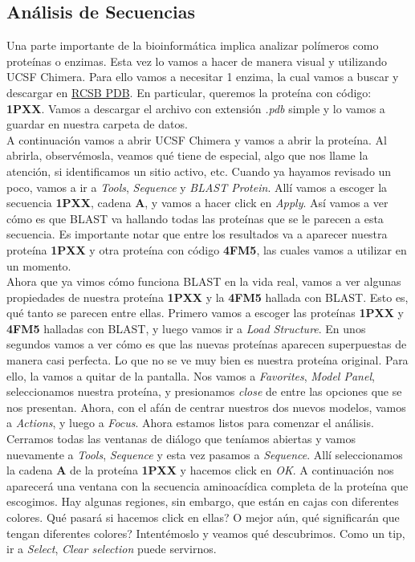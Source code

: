 \documentclass[10pt,letterpaper]{article}
\begin{document}
\subsection{An\'alisis de Secuencias}
Una parte importante de la bioinform\'atica implica analizar pol\'imeros como prote\'inas o enzimas. Esta vez lo vamos a hacer de manera visual y utilizando UCSF Chimera. Para ello vamos a necesitar 1 enzima, la cual vamos a buscar y descargar en \href{http://www.rcsb.org/pdb/home/home.do}{RCSB PDB}. En particular, queremos la prote\'ina con c\'odigo: \textbf{1PXX}. Vamos a descargar el archivo con extensi\'on \emph{.pdb} simple y lo vamos a guardar en nuestra carpeta de datos.\\

A continuaci\'on vamos a abrir UCSF Chimera y vamos a abrir la prote\'ina. Al abrirla, observ\'emosla, veamos qu\'e tiene de especial, algo que nos llame la atenci\'on, si identificamos un sitio activo, etc. Cuando ya hayamos revisado un poco, vamos a ir a \emph{Tools}, \emph{Sequence} y \emph{BLAST Protein}. All\'i vamos a escoger la secuencia \textbf{1PXX}, cadena \textbf{A}, y vamos a hacer click en \emph{Apply}. As\'i vamos a ver c\'omo es que BLAST va hallando todas las prote\'inas que se le parecen a esta secuencia. Es importante notar que entre los resultados va a aparecer nuestra prote\'ina \textbf{1PXX} y otra prote\'ina con c\'odigo \textbf{4FM5}, las cuales vamos a utilizar en un momento.\\

Ahora que ya vimos c\'omo funciona BLAST en la vida real, vamos a ver algunas propiedades de nuestra prote\'ina \textbf{1PXX} y la \textbf{4FM5} hallada con BLAST. Esto es, qu\'e tanto se parecen entre ellas. Primero vamos a escoger las prote\'inas \textbf{1PXX} y \textbf{4FM5} halladas con BLAST, y luego vamos ir a \emph{Load Structure}. En unos segundos vamos a ver c\'omo es que las nuevas prote\'inas aparecen superpuestas de manera casi perfecta. Lo que no se ve muy bien es nuestra prote\'ina original. Para ello, la vamos a quitar de la pantalla. Nos vamos a \emph{Favorites}, \emph{Model Panel}, seleccionamos nuestra prote\'ina, y presionamos \emph{close} de entre las opciones que se nos presentan. Ahora, con el af\'an de centrar nuestros dos nuevos modelos, vamos a \emph{Actions}, y luego a \emph{Focus}. Ahora estamos listos para comenzar el an\'alisis.\\

Cerramos todas las ventanas de di\'alogo que ten\'iamos abiertas y vamos nuevamente a \emph{Tools}, \emph{Sequence} y esta vez pasamos a \emph{Sequence}. All\'i seleccionamos la cadena \textbf{A} de la prote\'ina \textbf{1PXX} y hacemos click en \emph{OK}. A continuaci\'on nos aparecer\'a una ventana con la secuencia aminoac\'idica completa de la prote\'ina que escogimos. Hay algunas regiones, sin embargo, que est\'an en cajas con diferentes colores. Qu\'e pasar\'a si hacemos click en ellas? O mejor a\'un, qu\'e significar\'an que tengan diferentes colores? Intent\'emoslo y veamos qu\'e descubrimos. Como un tip, ir a \emph{Select}, \emph{Clear selection} puede servirnos.\\
\end{document}
